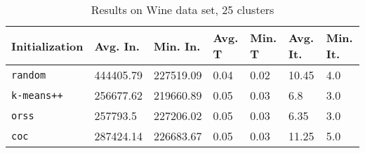 \begin{table}[h]
	\begin{center}
		\begin{tabular}{|l|l|l|l|l|l|l|}
			\hline
			Initialization & Avg. In. & Min. In. & Avg. T & Min. T & Avg. It. & Min. It.\\\hline
			\texttt{random} & 444405.79 & 227519.09 & 0.04 & 0.02 & 10.45 & 4.0\\\hline
			\texttt{k-means++} & 256677.62 & 219660.89 & 0.05 & 0.03 & 6.8 & 3.0\\\hline
			\texttt{orss} & 257793.5 & 227206.02 & 0.05 & 0.03 & 6.35 & 3.0\\\hline
			\texttt{coc} & 287424.14 & 226683.67 & 0.05 & 0.03 & 11.25 & 5.0\\\hline
		\end{tabular}
		\caption{Results on Wine data set, 25 clusters}
		\label{tbl:Wine25}
	\end{center}
\end{table}

